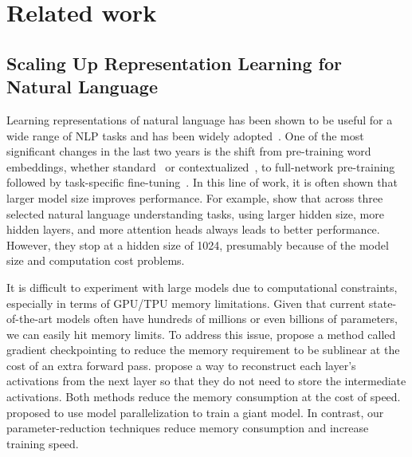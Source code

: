 \section{Related work}

\subsection{Scaling Up Representation Learning for Natural Language}
Learning representations of natural language has been shown to be useful for a wide range of NLP tasks and has been widely adopted~\citep{mikolov2013distributed,le-mikolov:2014,dai2015semi, peters2018deep,devlin2018bert,radford2018improving,radford2019language}.
One of the most significant changes in the last two years is the shift from pre-training word embeddings, whether standard~\citep{mikolov2013distributed,pennington-etal-2014-glove} or contextualized~\citep{NIPS2017_7209,peters2018deep}, to full-network pre-training followed by task-specific fine-tuning~\citep{dai2015semi, radford2018improving,devlin2018bert}.
In this line of work, it is often shown that larger model size improves performance.
For example, \cite{devlin2018bert} show that across three selected natural language understanding tasks, using larger hidden size, more hidden layers, and more attention heads always leads to better performance.
However, they stop at a hidden size of 1024, presumably because of the model size and computation cost problems. 

It is difficult to experiment with large models due to computational constraints, especially in terms of 
GPU/TPU memory limitations.
Given that current state-of-the-art models often have hundreds of millions or even billions of parameters, we can easily hit  memory limits.
To address this issue, \cite{chen2016training} propose a method called gradient checkpointing to reduce the memory requirement to be sublinear at the cost of an extra forward pass. 
\cite{gomez2017reversible} propose a way to reconstruct each layer's activations from the next layer so that they do not need to store the intermediate activations.
Both methods reduce the memory consumption at the cost of speed. \cite{raffel2019exploring} proposed to use model parallelization to train a giant model.
In contrast, our parameter-reduction techniques reduce memory consumption and increase training speed. 



